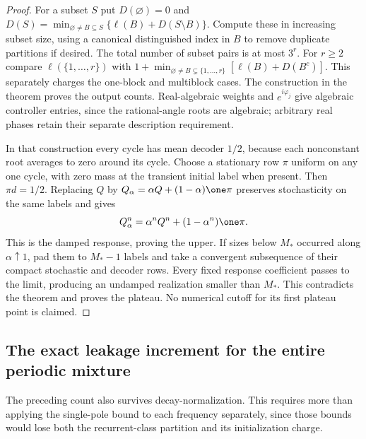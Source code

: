 \begin{proof}
For a subset $S$ put $D(\varnothing)=0$ and
$D(S)=\min_{\varnothing\ne B\subseteq S}\{\ell(B)+D(S\setminus B)\}$.
Compute these in increasing subset size, using a canonical distinguished index in $B$ to remove duplicate partitions if desired. The total number of subset pairs is at most $3^r$. For $r\ge2$ compare $\ell(\{1,\ldots,r\})$ with
$1+\min_{\varnothing\ne B\subsetneq\{1,\ldots,r\}}[\ell(B)+D(B^c)]$.
This separately charges the one-block and multiblock cases. The construction in the theorem proves the output counts. Real-algebraic weights and $e^{i\varphi_j}$ give algebraic controller entries, since the rational-angle roots are algebraic; arbitrary real phases retain their separate description requirement.

In that construction every cycle has mean decoder $1/2$, because each nonconstant root averages to zero around its cycle. Choose a stationary row $\pi$ uniform on any one cycle, with zero mass at the transient initial label when present. Then $\pi d=1/2$. Replacing $Q$ by $Q_\alpha=\alpha Q+(1-\alpha)\one\pi$ preserves stochasticity on the same labels and gives
\[
 Q_\alpha^n=\alpha^nQ^n+(1-\alpha^n)\one\pi.
\]
This is the damped response, proving the upper. If sizes below $M_*$ occurred along $\alpha\uparrow1$, pad them to $M_*-1$ labels and take a convergent subsequence of their compact stochastic and decoder rows. Every fixed response coefficient passes to the limit, producing an undamped realization smaller than $M_*$. This contradicts the theorem and proves the plateau. No numerical cutoff for its first plateau point is claimed.
\end{proof}

\subsection{The exact leakage increment for the entire periodic mixture}
The preceding count also survives decay-normalization. This requires more than applying the single-pole bound to each frequency separately, since those bounds would lose both the recurrent-class partition and its initialization charge.

